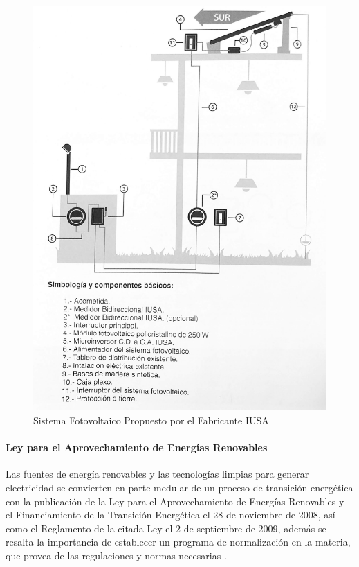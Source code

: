 \begin{figure}[H]
	\centering
	\includegraphics[scale=.1]{Capitulo2/images/sistema-fotovoltaico.jpg}
	\caption{Sistema Fotovoltaico Propuesto por el Fabricante IUSA}
	\label{fig:diagrama_dispensador}
\end{figure}

\paragraph{Ley para el Aprovechamiento de Energías Renovables}
Las fuentes de energía renovables y las tecnologías limpias para generar electricidad se convierten en parte medular de un proceso de transición energética con la publicación de la
Ley para el Aprovechamiento de Energías Renovables y el Financiamiento de la Transición
Energética el 28 de noviembre de 2008, así como el Reglamento de la citada Ley el 2 de septiembre de 2009, además se resalta la importancia de establecer un programa de normalización en la
materia, que provea de las regulaciones y normas necesarias \citep{LeyAprovechamiento}.



